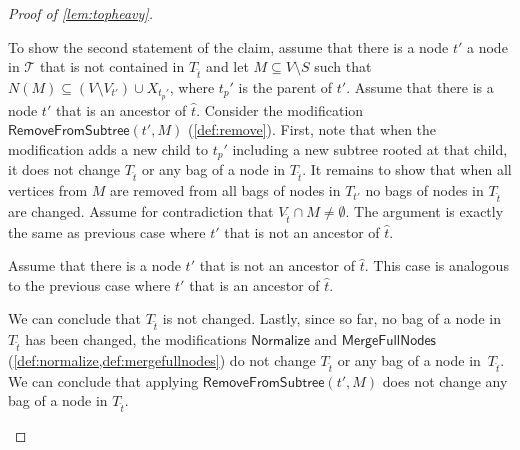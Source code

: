 \documentclass[a4paper,UKenglish,cleveref, autoref, thm-restate, numberwithinsect]{lipics-v2021}
\newcounter{modification}
\newcommand{\Normalize}{\mathsf{Normalize}}
\newcommand{\RemoveFromSubtree}{\mathsf{RemoveFromSubtree}}
\newcommand{\MergeFullNodes}{\mathsf{MergeFullNodes}}
\begin{document}
\begin{proof}[Proof of \cref{lem:topheavy}]
\begin{claimproof}
To show the second statement of the claim, assume that there is a node $t'$ a node in $\mathcal{T}$ that is not contained in $T_{\hat{t}}$ and let $M\subseteq V\setminus S$ such that $N(M)\subseteq (V\setminus V_{t'})\cup X_{t_p'}$, where $t_p'$ is the parent of $t'$. 
Assume that there is a node $t'$ that is an ancestor of $\hat{t}$.
Consider the modification $\RemoveFromSubtree(t', M)$ (\cref{def:remove}). First, note that when the modification adds a new child to $t_p'$ including a new subtree rooted at that child, it does not change $T_{\hat{t}}$ or any bag of a node in $T_{\hat{t}}$. It remains to show that when all vertices from $M$ are removed from all bags of nodes in $T_{t'}$ no bags of nodes in $T_{\hat{t}}$ are changed. Assume for contradiction that $V_{\hat{t}} \cap M\neq \emptyset$. The argument is exactly the same as previous case where  $t'$ that is not an ancestor of $\hat{t}$.





Assume that there is a node $t'$ that is not an ancestor of $\hat{t}$.
This case is analogous to the previous case where $t'$ that is an ancestor of $\hat{t}$.

We can conclude that $T_{\hat{t}}$ is not changed. Lastly, since so far, no bag of a node in~$T_{\hat{t}}$ has been changed, the modifications $\Normalize$ and $\MergeFullNodes$ (\cref{def:normalize,def:mergefullnodes}) do not change $T_{\hat{t}}$ or any bag of a node in~$T_{\hat{t}}$. We can conclude that applying $\RemoveFromSubtree(t', M)$ does not change any bag of a node in $T_{\hat{t}}$.
\end{claimproof}


\end{proof}
\end{document}
